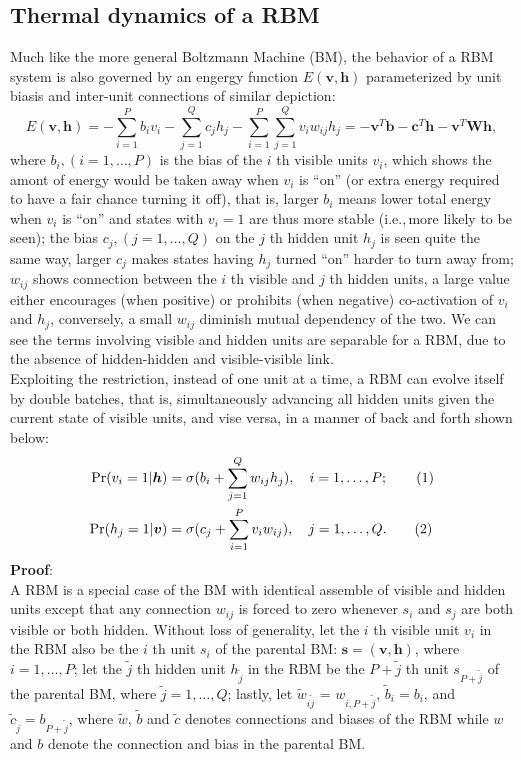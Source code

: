 \documentclass[11pt]{article}
\newcommand\numberthis{\addtocounter{equation}{1}\tag{\theequation}}
\newcommand{\vb}{\boldsymbol{b}}
\newcommand{\vc}{\boldsymbol{c}}
\newcommand{\vh}{\boldsymbol{h}}
\newcommand{\vv}{\boldsymbol{v}}
\newcommand{\vs}{\boldsymbol{s}}
\newcommand{\mw}{\boldsymbol{W}}
\begin{document}
{\subsection{Thermal dynamics of a RBM}
Much like the more general Boltzmann Machine (BM), the behavior of a RBM system is also governed by an engergy function $E(\vv, \vh)$ parameterized by unit biasis and inter-unit connections of similar depiction:
\begin{equation} \label{eq:rbm:e(s)}
  E(\vv, \vh) = -\sum_{i=1}^{P}{b_i v_i} - \sum_{j=1}^{Q}{c_j h_j} - \sum_{i=1}^P\sum_{j=1}^Q{v_i w_{ij} h_j} = -\vv^T\vb - \vc^T\vh - \vv^T \mw \vh,
\end{equation}
where $b_i, (i=1, \dots, P)$ is the bias of the $i$ th visible units $v_i$, which shows the amont of energy would be taken away when $v_i$ is ``on'' (or extra energy required to have a fair chance turning it off), that is, larger $b_i$ means lower total energy when $v_i$ is ``on'' and states with $v_i=1$ are thus more stable (i.e.,\,more likely to be seen); the bias $c_j, (j=1, \dots, Q)$ on the $j$ th hidden unit $h_j$ is seen quite the same way, larger $c_j$ makes states having $h_j$ turned ``on'' harder to turn away from; $w_{ij}$ shows connection between the $i$ th visible and $j$ th hidden units, a large value either encourages (when positive) or prohibits (when negative) co-activation of $v_i$ and $h_j$, conversely, a small $w_{ij}$ diminish mutual dependency of the two. We can see the terms involving visible and hidden units are separable for a RBM, due to the absence of hidden-hidden and visible-visible link. \\
Exploiting the restriction, instead of one unit at a time, a RBM can evolve itself by double batches, that is, simultaneously advancing all hidden units given the current state of visible units, and vise versa, in a manner of back and forth shown below:
\begin{align*}
  \Pr(v_i=1|\vh) & = \sigma(b_i + \sum_{j=1}^Q{w_{ij} h_j}), \quad i = 1, \dots, P; \numberthis \label{eq:rbm:p(v|h)} \\
  \Pr(h_j=1|\vv) & = \sigma(c_j + \sum_{i=1}^P{v_i w_{ij}}), \quad j = 1, \dots, Q. \numberthis \label{eq:rbm:p(h|v)}
\end{align*}
\textbf{Proof}: \\
\newcommand{\jt}{\tilde{j}}
\newcommand{\wt}{\tilde{w}}
\newcommand{\bt}{\tilde{b}}
\newcommand{\ct}{\tilde{c}}
A RBM is a special case of the BM with identical assemble of visible and hidden units except that any connection $w_{ij}$ is forced to zero whenever $s_i$ and $s_j$ are both visible or both hidden. Without loss of generality, let the $i$ th visible unit $v_i$ in the RBM also be the $i$ th unit $s_i$ of the parental BM: $\vs=(\vv, \vh)$, where $i=1, \dots, P$; let the $\jt$ th hidden unit $h_{\jt}$ in the RBM be the $P+\jt$ th unit $s_{P+\jt}$ of the parental BM, where $\jt=1, \dots, Q$; lastly, let $\wt_{i\jt}$ = $w_{i,P+\jt}$, $\bt_i = b_i$, and $\ct_{\jt} = b_{P+\jt}$, where $\wt$, $\bt$ and $\ct$ denotes connections and biases of the RBM while $w$ and $b$ denote the connection and bias in the parental BM.
}
\end{document}
